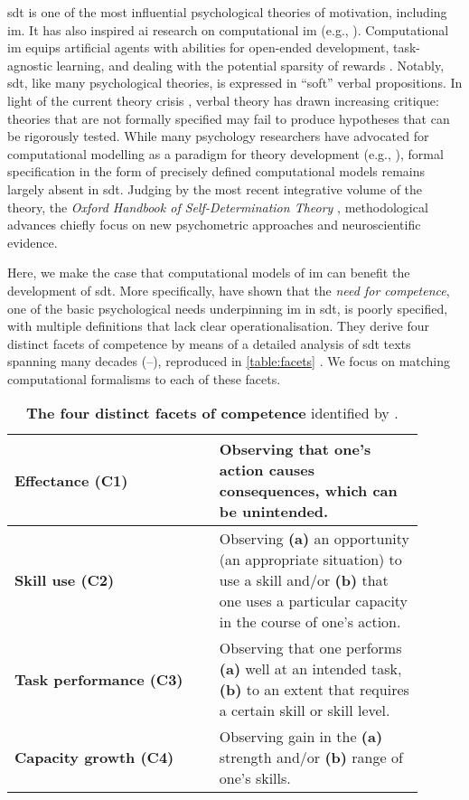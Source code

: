 \documentclass[10pt,letterpaper]{article}
\begin{document}
\Gls{sdt} \citep{deci1985intrinsic} is one of the most influential psychological theories of motivation, including \gls{im}. It has also inspired \gls{ai} research on computational \gls{im} (e.g., \citealp{oudeyer2007what}). Computational \gls{im} equips artificial agents with abilities for open-ended development, task-agnostic learning, and dealing with the potential sparsity of rewards \citep[p.~1161]{colas2022autotelic}. Notably, \gls{sdt}, like many psychological theories, is expressed in ``soft'' verbal propositions. In light of the current theory crisis \citep{oberauer2019addressing}, verbal theory has drawn increasing critique: theories that are not formally specified may fail to produce hypotheses that can be rigorously tested. While many psychology researchers have advocated for computational modelling as a paradigm for theory development (e.g., \citealp{marsella2010computational,oberauer2019addressing,robinaugh2021invisible}), formal specification in the form of precisely defined computational models remains largely absent in \gls{sdt}. Judging by the most recent integrative volume of the theory, the \emph{Oxford Handbook of Self-Determination Theory} \citep{ryan2023oxford}, methodological advances chiefly focus on new psychometric approaches and neuroscientific evidence.

Here, we make the case that computational models of \gls{im} can benefit the development of \gls{sdt}. More specifically, \citet{deterding2024why} have shown that the \emph{need for competence}, one of the basic psychological needs underpinning \gls{im} in \gls{sdt}, is poorly specified, with multiple definitions that lack clear operationalisation. They derive four distinct facets of competence by means of a detailed analysis of \gls{sdt} texts spanning many decades (\citeyear{deci1985intrinsic}--\citeyear{ryan2023oxford}), reproduced in \autoref{table:facets} \citep[pp.~7--10]{deterding2024why}. We focus on matching computational formalisms to each of these facets.

\begin{table}[h]
\centering
\caption{\textbf{The four distinct facets of competence} identified by \citet[pp.~7--10]{deterding2024why}.} 
\label{table:facets} 
\vskip 0.12in
\begin{tabular}{>{\raggedright\arraybackslash}p{0.45\linewidth}>{\raggedright\arraybackslash}p{0.45\linewidth}}
\toprule
\textbf{Effectance (C1)} & Observing that one's action causes consequences, which can be unintended. \\
\midrule
\textbf{Skill use (C2)} & Observing \textbf{(a)} an opportunity (an appropriate situation) to use a skill and/or \textbf{(b)} that one uses a particular capacity in the course of one's action. \\
\midrule
\textbf{Task performance (C3)} & Observing that one performs \textbf{(a)} well at an intended task, \textbf{(b)} to an extent that requires a certain skill or skill level. \\
\midrule
\textbf{Capacity growth (C4)} & Observing gain in the \textbf{(a)} strength and/or \textbf{(b)} range of one's skills. \\
\bottomrule
\end{tabular}
\end{table}
\end{document}

